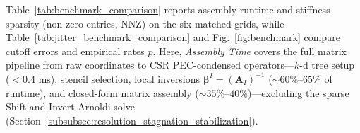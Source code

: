 \documentclass[VANCOUVER]{USG}
\begin{document}
Table~\ref{tab:benchmark_comparison} reports assembly runtime and stiffness sparsity (non-zero entries, NNZ) on the six matched grids, while Table~\ref{tab:jitter_benchmark_comparison} and Fig.~\ref{fig:benchmark} compare cutoff errors and empirical rates $p$. Here, \emph{Assembly Time} covers the full matrix pipeline from raw coordinates to CSR PEC-condensed operators---$k$-d tree setup ($< 0.4\text{ ms}$), stencil selection, local inversions $\boldsymbol{\beta}^I = (\mathbf{A}_I)^{-1}$ ($\sim 60\%\text{--}65\%$ of runtime), and closed-form matrix assembly ($\sim 35\%\text{--}40\%$)---excluding the sparse Shift-and-Invert Arnoldi solve (Section~\ref{subsubsec:resolution_stagnation_stabilization}).

\begin{table}[!t]
    \centering
    \small
    \caption{Computational benchmark on the 2D PEC resonant cavity across the six grid resolutions matching \cite{stable_vnmm2d_2026}: assembly runtime (scoped in the text, excluding eigensolver solves) and global stiffness non-zero entries (NNZ) for calibrated VNMM-MLPG ($\beta = 1.5$, $\gamma = 1$, $c_{\mathrm{stab}} = 4.0$) vs. VNMM-Gauss ($3 \times 3$ cell quadrature, $s_{\mathrm{div}} = 6.0$). On finer grids, VNMM-MLPG reaches $64,301$ NNZ ($3,969$ DoFs) at $65\times 65$ and $102,015$ NNZ ($6,241$ DoFs) at $81\times 81$.}
    \label{tab:benchmark_comparison}
\end{table}
\end{document}

